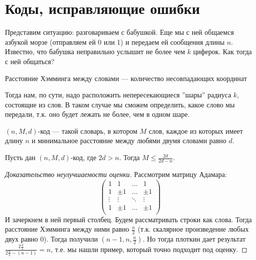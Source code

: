 \section{Коды, исправляющие ошибки}
Представим ситуацию: разговариваем с бабушкой. Еще мы с ней общаемся азбукой морзе (отправляем ей 0 или 1) и передаем ей сообщения длины \(n\). Известно, что бабушка неправильно услышит не более чем \(k\) циферок. Как тогда с ней общаться?
\begin{definition}
    Расстояние Хэмминга между словами --- количество несовпадающих координат
\end{definition}
Тогда нам, по сути, надо расположить непересекающиеся ''шары'' радиуса \(k\), состоящие из слов. В таком случае мы сможем определить, какое слово мы передали, т.к. оно будет лежать не более, чем в одном шаре.
\begin{definition}
    \((n, M, d)\)-код --- такой словарь, в котором \(M\) слов, каждое из которых имеет длину \(n\) и минимальное расстояние между любями двумя словами равно \(d\).
\end{definition}
\begin{theorem}
    Пусть дан \((n, M, d)\)-код, где \(2d > n\). Тогда \(M  \le \frac{2d}{2d - n}\).
\end{theorem}
\begin{proof}[Доказательство неулучшаемости оценки]
    Рассмотрим матрицу Адамара:
    \[\left(\begin{array}{cccc}
        1 & 1 & \dots &  1 \\
        1 & \pm 1 & \dots & \pm 1 \\
        \vdots & \vdots & \ddots & \vdots\\
        1 & \pm 1 & \dots & \pm 1 \\
    \end{array}\right)\]
    И зачеркнем в ней первый столбец. Будем рассматривать строки как слова. Тогда расстояние Хэмминга между ними равно \(\frac{n}{2}\) (т.к. скалярное произведение любых двух равно 0). Тогда получили \(\left(n-1, n, \frac{n}{2}\right)\). Но тогда плоткин дает результат \(\frac{2\frac{n}{2}}{2\frac{n}{2} - (n - 1)} = n\), т.е. мы нашли пример, который точно подходит под оценку.
\end{proof}